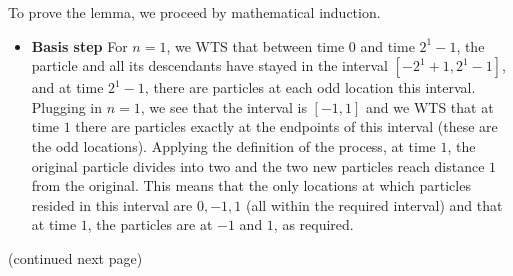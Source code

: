\documentclass[12pt, oneside]{article}
\begin{document}
\begin{description}
{  To prove the lemma, we proceed by mathematical induction.

  \begin{itemize}
    \item {\bf Basis step} For $n=1$, we WTS that between time $0$ and
      time $2^1-1$, the particle and all its descendants have stayed in the interval
      $[-2^1+1, 2^1-1]$, and at time $2^1-1$, there are particles at each odd location
      this interval.  Plugging in $n=1$, we see that the interval is $[-1,1]$ and we WTS that 
      at time $1$ there are particles exactly at the endpoints of this interval (these are 
      the odd locations).  Applying the definition of the process, at time $1$, the original 
      particle divides into two and the two new particles reach distance $1$ from the original.
      This means that the only locations at which particles resided in this interval are
      $0,-1,1$ (all within the required interval) and that at time $1$, the particles
      are at $-1$ and $1$, as required.
  \end{itemize}  
  (continued next page)
  }
\fi
{}
\end{description}
\end{document}
